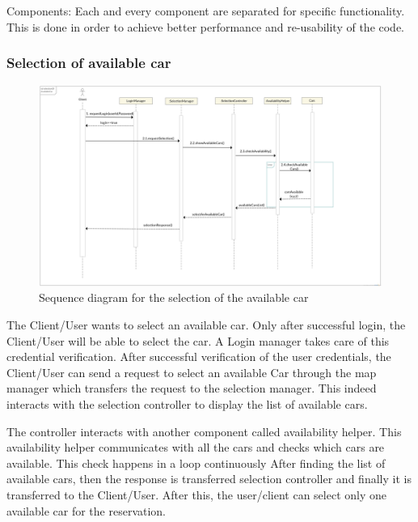 Components:
Each and every component are separated for specific functionality. This is done in order to achieve better performance and re-usability of the code.

\subsubsection{Selection of available car}
\begin{figure}[h]
	\centering
	\includegraphics[width=\linewidth,keepaspectratio]{figures/selection_available_car_runtime.eps}
	\caption{Sequence diagram for the selection of the available car}
	\label{fig:selection_available_car_runtime}
\end{figure}

The Client/User wants to select an available car. Only after successful login, the Client/User will be able to select the car. A Login manager takes care of this credential verification.
After successful verification of the user credentials, the Client/User can send a request to select an available Car through the map manager which transfers the request to the selection
manager. This indeed interacts with the selection controller to display the list of available cars.

The controller interacts with another component called availability helper.
This availability helper communicates with all the cars and checks which cars are available. This check happens in a loop continuously After finding the list of available cars, then the response is transferred selection controller and finally it is transferred to the Client/User. After this, the user/client can select only one available car for the reservation.


